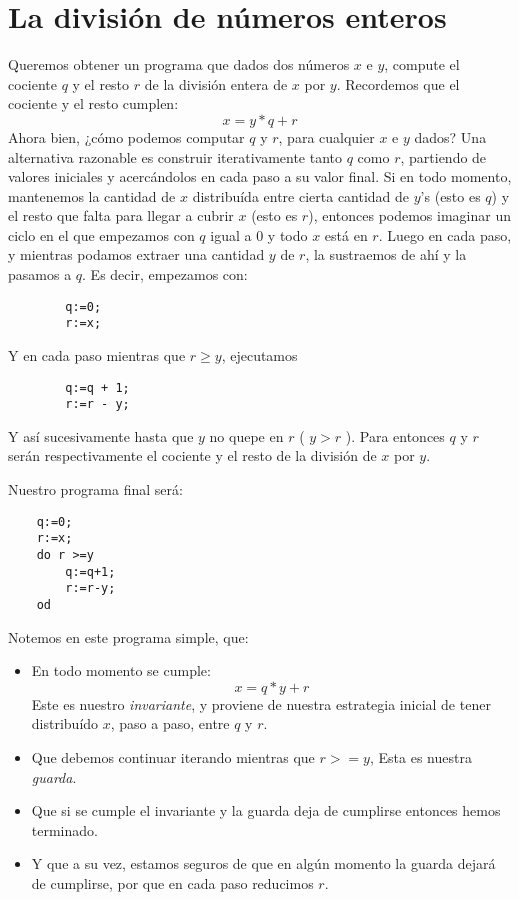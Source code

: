 \documentclass[12pt, a4paper, openany, fleqn]{book}
\begin{document}
    \section{La división de números enteros}
    Queremos obtener un programa que dados dos números $x$ e $y$, compute el cociente $q$ y el resto $r$ de la división entera de $x$ por $y$.
    Recordemos que el cociente y el resto cumplen:
    $$x = y * q + r$$
    Ahora bien, ¿cómo podemos computar $q$ y $r$, para cualquier $x$ e $y$ dados?
    Una alternativa razonable es construir iterativamente tanto $q$ como $r$, partiendo de valores iniciales y acercándolos en cada paso a su valor final.
    Si en todo momento, mantenemos la cantidad de $x$ distribuída entre cierta cantidad de $y$’s (esto es $q$) y el resto que falta para llegar a cubrir $x$ (esto es $r$), entonces podemos imaginar un ciclo en el que empezamos con $q$ igual a 0 y todo $x$ está en $r$.
    Luego en cada paso, y mientras podamos extraer una cantidad $y$ de $r$, la sustraemos de ahí y la pasamos a $q$.
    Es decir, empezamos con:
    \begin{verbatim}
        q:=0;
        r:=x;
    \end{verbatim}
    Y en cada paso mientras que $r \geq y$, ejecutamos
    \begin{verbatim}
        q:=q + 1;
        r:=r - y;
    \end{verbatim}

    Y así sucesivamente hasta que $y$ no quepe en $r$ ( $ y > r $ ). Para entonces $q$ y $r$ serán respectivamente el cociente y el resto de la división de $x$ por $y$.

    Nuestro programa final será:
    \begin{verbatim}
    q:=0;
    r:=x;
    do r >=y
        q:=q+1;
        r:=r-y;
    od
    \end{verbatim}
    Notemos en este programa simple, que:
    \begin{itemize}
        \item En todo momento se cumple:
        $$x = q * y + r$$
        Este es nuestro \textit{invariante}, y proviene de nuestra estrategia inicial de tener distribuído $x$, paso a paso, entre $q$ y $r$.
        \item Que debemos continuar iterando mientras que $r >= y$,
        Esta es nuestra \textit{guarda}.
        \item Que si se cumple el invariante y la guarda deja de cumplirse entonces hemos terminado.
        \item Y que a su vez, estamos seguros de que en algún momento la guarda dejará de cumplirse, por que en cada paso reducimos $r$.
    \end{itemize}
\end{document}
